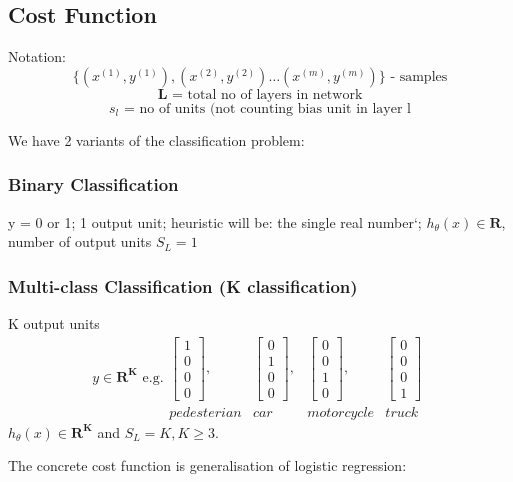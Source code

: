 \documentclass{scrartcl}
\begin{document}
\subsection{Cost Function}
\label{sec:9-1}
Notation:
\[ \{ (x^{(1)}, y^{(1)}), (x^{(2)}, y^{(2)}) \dots (x^{(m)}, y^{(m)})
\} \textrm{ - samples} \]
\[ \mathbf{L} \textrm{ = total no of layers in network} \]
\[ s_l \textrm{ = no of units (not counting bias unit in layer l}\]

We have 2 variants of the classification problem:

\subsubsection{Binary Classification}
y = 0 or 1; 1 output unit; heuristic will be: the single real number`;
$h_\theta(x) \in \mathbf{R}$, number of output units $S_L = 1$

\subsubsection{Multi-class Classification (K classification)}
\label{sec:9-1}
K output units
\[y \in \mathbf{R^K} \textrm{ e.g.} \begin{array}{cccc}
  \left[ \begin{array}{c} 1 \\ 0 \\ 0 \\ 0 \end{array} \right], &
  \left[ \begin{array}{c} 0 \\ 1 \\ 0 \\ 0 \end{array} \right], &
  \left[ \begin{array}{c} 0 \\ 0 \\ 1 \\ 0 \end{array} \right], &
  \left[ \begin{array}{c} 0 \\ 0 \\ 0
      \\ 1 \end{array} \right] \\
  pedesterian & car & motorcycle & truck
\end{array} \]
$h_\theta(x) \in \mathbf{R^K}$ and $S_L = K, K \geq 3$.  

The concrete cost function is generalisation of logistic regression:
\end{document}
